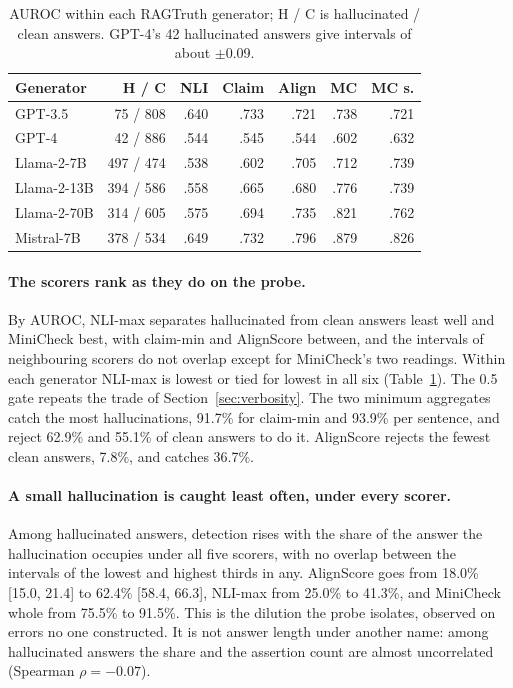 \documentclass[11pt]{article}
\begin{document}
\begin{table}[t]
\centering
\footnotesize
\setlength{\tabcolsep}{2.5pt}
\begin{tabular}{lrrrrrr}
\toprule
\textbf{Generator} & \textbf{H / C} & \textbf{NLI} & \textbf{Claim} & \textbf{Align} & \textbf{MC} & \textbf{MC s.} \\
\midrule
GPT-3.5 & 75 / 808 & .640 & .733 & .721 & .738 & .721 \\
GPT-4 & 42 / 886 & .544 & .545 & .544 & .602 & .632 \\
Llama-2-7B & 497 / 474 & .538 & .602 & .705 & .712 & .739 \\
Llama-2-13B & 394 / 586 & .558 & .665 & .680 & .776 & .739 \\
Llama-2-70B & 314 / 605 & .575 & .694 & .735 & .821 & .762 \\
Mistral-7B & 378 / 534 & .649 & .732 & .796 & .879 & .826 \\
\bottomrule
\end{tabular}
\caption{AUROC within each RAGTruth generator; H / C is hallucinated / clean answers. GPT-4's 42 hallucinated answers give intervals of about $\pm$0.09.}
\label{tab:ragtruthgen}
\end{table}

\paragraph{The scorers rank as they do on the probe.} By AUROC, NLI-max separates hallucinated from clean answers least well and MiniCheck best, with claim-min and AlignScore between, and the intervals of neighbouring scorers do not overlap except for MiniCheck's two readings. Within each generator NLI-max is lowest or tied for lowest in all six (Table~\ref{tab:ragtruthgen}). The 0.5 gate repeats the trade of Section~\ref{sec:verbosity}. The two minimum aggregates catch the most hallucinations, 91.7\% for claim-min and 93.9\% per sentence, and reject 62.9\% and 55.1\% of clean answers to do it. AlignScore rejects the fewest clean answers, 7.8\%, and catches 36.7\%.

\paragraph{A small hallucination is caught least often, under every scorer.} Among hallucinated answers, detection rises with the share of the answer the hallucination occupies under all five scorers, with no overlap between the intervals of the lowest and highest thirds in any. AlignScore goes from 18.0\% [15.0, 21.4] to 62.4\% [58.4, 66.3], NLI-max from 25.0\% to 41.3\%, and MiniCheck whole from 75.5\% to 91.5\%. This is the dilution the probe isolates, observed on errors no one constructed. It is not answer length under another name: among hallucinated answers the share and the assertion count are almost uncorrelated (Spearman $\rho = -0.07$).
\end{document}
